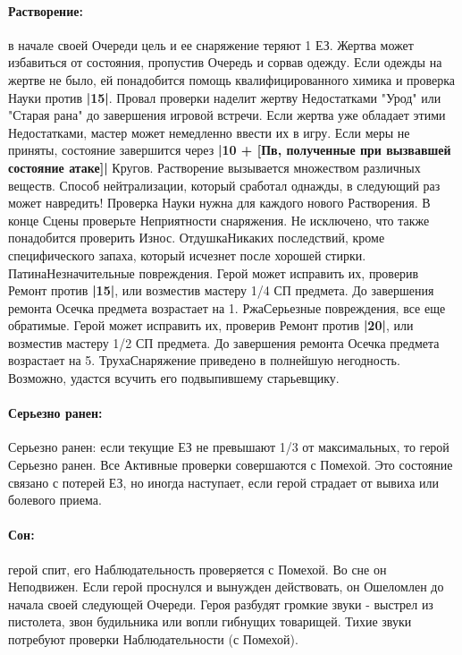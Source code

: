 \paragraph{Растворение:} в начале своей Очереди цель и ее снаряжение теряют 1 ЕЗ. Жертва может избавиться от состояния, пропустив Очередь и сорвав одежду. Если одежды на жертве не было, ей понадобится помощь квалифицированного химика и проверка Науки против \textbf{|15|}. Провал проверки наделит жертву Недостатками "Урод" или "Старая рана" до завершения игровой встречи. Если жертва уже обладает этими Недостатками, мастер может немедленно ввести их в игру.
\newline Если меры не приняты, состояние завершится через \textbf{|10 + [Пв, полученные при вызвавшей состояние атаке]|} Кругов.
\newline Растворение вызывается множеством различных веществ. Способ нейтрализации, который сработал однажды, в следующий раз может навредить! Проверка Науки нужна для каждого нового Растворения.
\newline В конце Сцены проверьте Неприятности снаряжения. Не исключено, что также понадобится проверить Износ.
\trouble
{Отдушка}{Никаких последствий, кроме специфического запаха, который исчезнет после хорошей стирки.}
{Патина}{Незначительные повреждения. Герой может исправить их, проверив Ремонт против \textbf{|15|}, или возместив мастеру 1/4 СП предмета. До завершения ремонта Осечка предмета возрастает на 1.}
{Ржа}{Серьезные повреждения, все еще обратимые. Герой может исправить их, проверив Ремонт против \textbf{|20|}, или возместив мастеру 1/2 СП предмета. До завершения ремонта Осечка предмета возрастает на 5.}
{Труха}{Снаряжение приведено в полнейшую негодность. Возможно, удастся всучить его подвыпившему старьевщику.}
\paragraph{Серьезно ранен:} Серьезно ранен: если текущие ЕЗ не превышают 1/3 от максимальных, то герой Серьезно ранен. Все Активные проверки совершаются с Помехой. 
\newline Это состояние связано с потерей ЕЗ, но иногда наступает, если герой страдает от вывиха или болевого приема. 
\paragraph{Сон:} герой спит, его Наблюдательность проверяется с Помехой. Во сне он Неподвижен. Если герой проснулся и вынужден действовать, он Ошеломлен до начала своей следующей Очереди. 
\newline Героя разбудят громкие звуки - выстрел из пистолета, звон будильника или вопли гибнущих товарищей. Тихие звуки потребуют проверки Наблюдательности (с Помехой).
